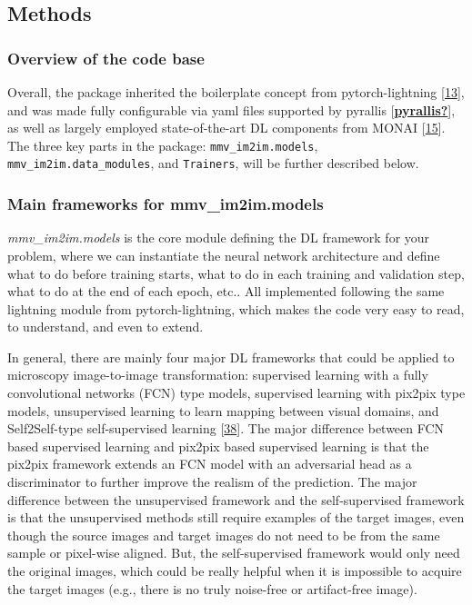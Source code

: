 \hypertarget{methods}{%
\subsection{Methods}\label{methods}}

\hypertarget{overview-of-the-code-base}{%
\subsubsection{Overview of the code base}\label{overview-of-the-code-base}}

Overall, the package inherited the boilerplate concept from pytorch-lightning {[}\protect\hyperlink{ref-YbvSvdyB}{13}{]}, and was made fully configurable via yaml files supported by pyrallis {[}\protect\hyperlink{ref-pyrallis}{\textbf{pyrallis?}}{]}, as well as largely employed state-of-the-art DL components from MONAI {[}\protect\hyperlink{ref-UU62HYC6}{15}{]}. The three key parts in the package: \texttt{mmv\_im2im.models}, \texttt{mmv\_im2im.data\_modules}, and \texttt{Trainers}, will be further described below.

\hypertarget{main-frameworks-for-mmv_im2im.models}{%
\subsubsection{Main frameworks for mmv\_im2im.models}\label{main-frameworks-for-mmv_im2im.models}}

\emph{mmv\_im2im.models} is the core module defining the DL framework for your problem, where we can instantiate the neural network architecture and define what to do before training starts, what to do in each training and validation step, what to do at the end of each epoch, etc.. All implemented following the same lightning module from pytorch-lightning, which makes the code very easy to read, to understand, and even to extend.

In general, there are mainly four major DL frameworks that could be applied to microscopy image-to-image transformation: supervised learning with a fully convolutional networks (FCN) type models, supervised learning with pix2pix type models, unsupervised learning to learn mapping between visual domains, and Self2Self-type self-supervised learning {[}\protect\hyperlink{ref-tuObtXMR}{38}{]}. The major difference between FCN based supervised learning and pix2pix based supervised learning is that the pix2pix framework extends an FCN model with an adversarial head as a discriminator to further improve the realism of the prediction. The major difference between the unsupervised framework and the self-supervised framework is that the unsupervised methods still require examples of the target images, even though the source images and target images do not need to be from the same sample or pixel-wise aligned. But, the self-supervised framework would only need the original images, which could be really helpful when it is impossible to acquire the target images (e.g., there is no truly noise-free or artifact-free image).


